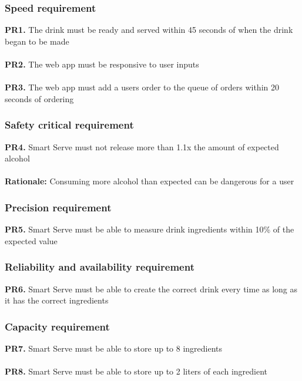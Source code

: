 \documentclass{article}
\begin{document}
    \subsubsection{Speed requirement}
        \noindent\textbf{PR1.} The drink must be ready and served within 45 seconds of when the drink began to be made \\\\
        \textbf{PR2.} The web app must be responsive to user inputs \\\\
        \textbf{PR3.} The web app must add a users order to the queue of orders within 20 seconds of ordering \\
    \subsubsection{Safety critical requirement}
        \noindent\textbf{PR4.} Smart Serve must not release more than 1.1x the amount of expected alcohol \\
        \\ \indent\textbf{Rationale:} Consuming more alcohol than expected can be dangerous for a user \\
    \subsubsection{Precision requirement}
        \noindent\textbf{PR5.} Smart Serve must be able to measure drink ingredients within 10\% of the expected value \\
    \subsubsection{Reliability and availability requirement}
        \noindent\textbf{PR6.} Smart Serve must be able to create the correct drink every time as long as it has the correct ingredients \\
    \subsubsection{Capacity requirement}
        \noindent\textbf{PR7.} Smart Serve must be able to store up to 8 ingredients \\\\
        \textbf{PR8.} Smart Serve must be able to store up to 2 liters of each ingredient \\\\
\end{document}
